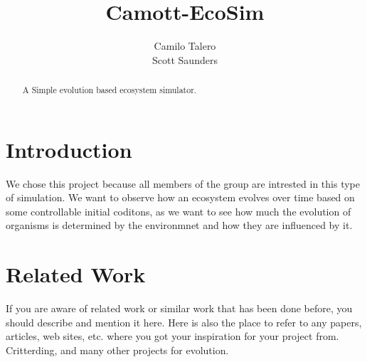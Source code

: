 \documentclass[runningheads]{llncs}
\begin{document}
\title{Camott-EcoSim}

\author{Camilo Talero \\  Scott Saunders  }


\maketitle


\begin{abstract} 
A Simple evolution based ecosystem simulator.
\end{abstract}


\section{Introduction}
\label{sec:Introduction}
%
We chose this project because all members of the group are intrested in this type of simulation. We want to observe how an ecosystem evolves over time based on some controllable initial coditons, as we want to see how much the evolution of organisms is determined by the environmnet and how they are influenced by it.

\section{Related Work}
If you are aware of related work or similar work that has been done before, you should describe and mention it here. Here is also the place to refer to any papers, articles, web sites, etc. where you got your inspiration for your project from.
Critterding, and many other projects for evolution.
\end{document}
